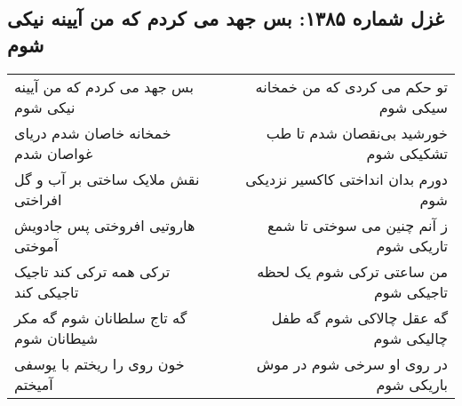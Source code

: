 \begin{center}
\section*{غزل شماره ۱۳۸۵: بس جهد می کردم که من آیینه نیکی شوم}
\label{sec:1385}
\begin{longtable}{l p{0.5cm} r}
بس جهد می کردم که من آیینه نیکی شوم
&&
تو حکم می کردی که من خمخانه سیکی شوم
\\
خمخانه خاصان شدم دریای غواصان شدم
&&
خورشید بی‌نقصان شدم تا طب تشکیکی شوم
\\
نقش ملایک ساختی بر آب و گل افراختی
&&
دورم بدان انداختی کاکسیر نزدیکی شوم
\\
هاروتیی افروختی پس جادویش آموختی
&&
ز آنم چنین می سوختی تا شمع تاریکی شوم
\\
ترکی همه ترکی کند تاجیک تاجیکی کند
&&
من ساعتی ترکی شوم یک لحظه تاجیکی شوم
\\
گه تاج سلطانان شوم گه مکر شیطانان شوم
&&
گه عقل چالاکی شوم گه طفل چالیکی شوم
\\
خون روی را ریختم با یوسفی آمیختم
&&
در روی او سرخی شوم در موش باریکی شوم
\\
\end{longtable}
\end{center}
